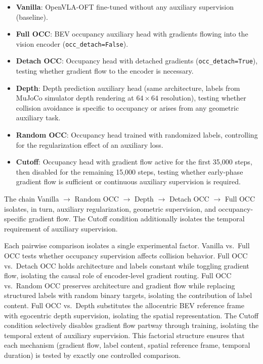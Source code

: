\begin{itemize}[nosep,leftmargin=*]
  \item \textbf{Vanilla}: OpenVLA-OFT fine-tuned without any auxiliary supervision (baseline).
  \item \textbf{Full OCC}: BEV occupancy auxiliary head with gradients flowing into the vision encoder (\texttt{occ\_detach=False}).
  \item \textbf{Detach OCC}: Occupancy head with detached gradients (\texttt{occ\_detach=True}), testing whether gradient flow to the encoder is necessary.
  \item \textbf{Depth}: Depth prediction auxiliary head (same architecture, labels from MuJoCo simulator depth rendering at $64{\times}64$ resolution), testing whether collision avoidance is specific to occupancy or arises from any geometric auxiliary task.
  \item \textbf{Random OCC}: Occupancy head trained with randomized labels, controlling for the regularization effect of an auxiliary loss.
  \item \textbf{Cutoff}: Occupancy head with gradient flow active for the first 35{,}000 steps, then disabled for the remaining 15{,}000 steps, testing whether early-phase gradient flow is sufficient or continuous auxiliary supervision is required.
\end{itemize}

\noindent The chain Vanilla $\to$ Random OCC $\to$ Depth $\to$ Detach OCC $\to$ Full OCC isolates, in turn, auxiliary regularization, geometric supervision, and occupancy-specific gradient flow. The Cutoff condition additionally isolates the temporal requirement of auxiliary supervision.

Each pairwise comparison isolates a single experimental factor. Vanilla vs.\ Full OCC tests whether occupancy supervision affects collision behavior. Full OCC vs.\ Detach OCC holds architecture and labels constant while toggling gradient flow, isolating the causal role of encoder-level gradient routing. Full OCC vs.\ Random OCC preserves architecture and gradient flow while replacing structured labels with random binary targets, isolating the contribution of label content. Full OCC vs.\ Depth substitutes the allocentric BEV reference frame with egocentric depth supervision, isolating the spatial representation. The Cutoff condition selectively disables gradient flow partway through training, isolating the temporal extent of auxiliary supervision. This factorial structure ensures that each mechanism (gradient flow, label content, spatial reference frame, temporal duration) is tested by exactly one controlled comparison.

